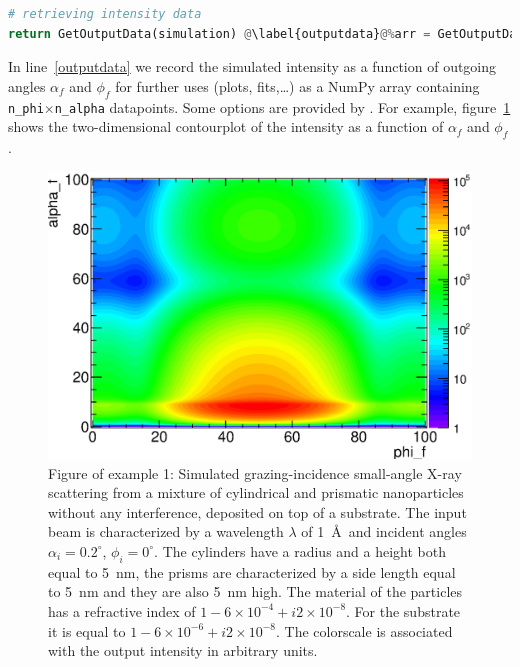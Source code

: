 \begin{lstlisting}[language=python, style=eclipseboxed,name=ex1,nolol]
# retrieving intensity data
return GetOutputData(simulation) @\label{outputdata}@%arr = GetOutputData(simulation) @\label{outputdata}@
\end{lstlisting}


\noindent In line~\ref{outputdata} we record the simulated intensity
as a function of outgoing angles $\alpha_f$ and $\phi_f$ for further
uses (plots, fits,\ldots) as a NumPy array containing
\texttt{n\_phi}$\times$\texttt{n\_alpha}
datapoints. Some options are provided by \BornAgain. For example, figure~\ref{fig:output_ex1} shows the two-dimensional
contourplot of the intensity as a function of $\alpha_f$ and
$\phi_f$. 

\begin{figure}[h]
  \begin{center}
   \includegraphics[clip=true, width=120mm]{Manual_ex1.eps}
  \end{center}
  \caption[Example 1: Simulated grazing-incidence small-angle X-ray scattering from a mixture of
cylindrical and prismatic nanoparticles without any interference, deposited on top
of a substrate]{Figure of example 1: Simulated grazing-incidence small-angle X-ray scattering from a mixture of
cylindrical and prismatic nanoparticles without any interference, deposited on top
of a substrate. The input beam is characterized by a wavelength
$\lambda$ of 1~\AA\ and incident angles $\alpha_i=0.2^{\circ}$, $\phi_i=0^{\circ}$. The
cylinders have a radius and a height both equal to 5~nm, the prisms
are characterized by a side length equal to 5~nm and they are also 5~nm high. The
material of the particles has a refractive index of $1-6\times 10^{-4}+i2\times 10^{-8}$. For the substrate
it is equal to $1-6\times 10^{-6} +i2\times 10^{-8} $. The colorscale
is associated with the output intensity in arbitrary units. }
\label{fig:output_ex1}
\end{figure}


